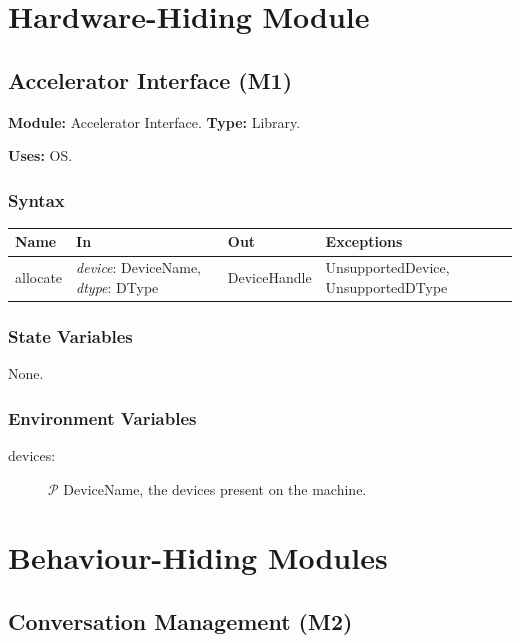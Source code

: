 \documentclass[12pt, titlepage]{article}
\begin{document}
\newpage
\section{Hardware-Hiding Module}

\subsection{Accelerator Interface (M1)}\label{mAccel}

\textbf{Module:} Accelerator Interface. \textbf{Type:} Library.

\textbf{Uses:} OS.

\subsubsection*{Syntax}

\begin{tabularx}{\textwidth}{l X l X}
\toprule
\textbf{Name} & \textbf{In} & \textbf{Out} & \textbf{Exceptions}\\
\midrule
allocate & \emph{device}: DeviceName, \emph{dtype}: DType & DeviceHandle & UnsupportedDevice, UnsupportedDType\\
\bottomrule
\end{tabularx}

\subsubsection*{State Variables}

None.

\subsubsection*{Environment Variables}

\begin{description}
\item[devices:] $\mathcal{P}$ DeviceName, the devices present on the machine.
\end{description}

\newpage
\section{Behaviour-Hiding Modules}

\subsection{Conversation Management (M2)}\label{mConv}
\end{document}
